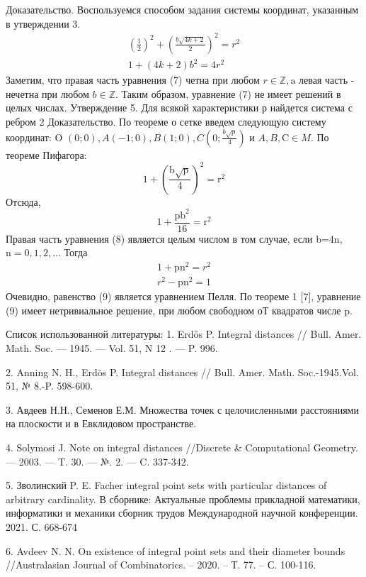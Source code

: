 \documentclass[a4paper,openbib]{article}
\begin{document}
Доказательство. Воспользуемся способом задания системы координат, указанным в утверждении $3 .$
$$
\begin{array}{c}
\left(\frac{1}{2}\right)^{2}+\left(\frac{b \sqrt{4 k+2}}{2}\right)^{2}=r^{2} \\
1+(4 k+2) b^{2}=4 r^{2}
\end{array}
$$
Заметим, что правая часть уравнения (7) четна при любом $r \in \mathbb{Z}, \mathrm{a}$ левая часть - нечетна при любом $b \in \mathbb{Z} .$ Таким образом, уравнение (7) не имеет решений в целых числах. Утверждение 5. Для всякой характеристики р найдется система с ребром 2
Доказательство. По теореме о сетке введем следующую систему
координат: O $(0 ; 0), A(-1 ; 0), B(1 ; 0), C\left(0 ; \frac{b \sqrt{\mathrm{p}}}{4}\right)$ и $A, B, \mathrm{C} \in M .$ По теореме
Пифагора:
$$
1+\left(\frac{\mathrm{b} \sqrt{\mathrm{p}}}{4}\right)^{2}=\mathrm{r}^{2}
$$
Отсюда,
$$
1+\frac{\mathrm{pb}^{2}}{16}=\mathrm{r}^{2}
$$
Правая часть уравнения (8) является целым числом в том случае, если b=4n, $\mathrm{n}=0,1,2, \ldots$ Тогда
$$
\begin{array}{l}
1+\mathrm{pn}^{2}=r^{2} \\
r^{2}-\mathrm{pn}^{2}=1
\end{array}
$$
Очевидно, равенство (9) является уравнением Пелля. По теореме 1 [7], уравнение (9) имеет нетривиальное решение, при любом свободном оТ квадратов числе $\mathrm{p} .$

Список использованной литературы:
1. Erdös P. Integral distances // Bull. Amer. Math. Soc. --- 1945. --- Vol. 51, N 12 . ---
P. 996.

2. Anning N. H., Erdös P. Integral distances // Bull. Amer. Math. Soc.-1945.Vol. 51, № 8.-P. 598-600.

3. Авдеев Н.Н., Семенов Е.М. Множества точек с целочисленными расстояниями на плоскости и в Евклидовом пространстве.

4. Solymosi J. Note on integral distances //Discrete \& Computational Geometry. --- 2003. --- T. 30. --- №. 2. --- C. 337-342.

5. Зволинский P. E. Facher integral point sets with particular distances of arbitrary cardinality.
В сборнике: Актуальные проблемы прикладной математики, информатики и механики сборник трудов Международной научной конференции. 2021. С. 668-674

6. Avdeev N. N. On existence of integral point sets and their diameter bounds //Australasian Journal of Combinatorics. – 2020. – Т. 77. – С. 100-116.
\end{document}
